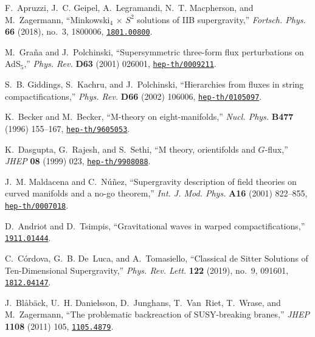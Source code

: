 \documentclass[12pt]{article}
\begin{document}
\begin{thebibliography}{10}
F.~Apruzzi, J.~C. Geipel, A.~Legramandi, N.~T. Macpherson, and M.~Zagermann,
  ``{Minkowski$_4$ $\times$ $S^2$ solutions of IIB supergravity},'' {\em
  Fortsch. Phys.} {\bf 66} (2018), no.~3, 1800006,
\href{http://arXiv.org/abs/1801.00800}{{\tt 1801.00800}}.


M.~Gra{\~n}a and J.~Polchinski, ``Supersymmetric {three-form} flux
  perturbations on {AdS$_5$},'' {\em Phys. Rev.} {\bf D63} (2001) 026001,
\href{http://arXiv.org/abs/hep-th/0009211}{{\tt hep-th/0009211}}.


S.~B. Giddings, S.~Kachru, and J.~Polchinski, ``Hierarchies from fluxes in
  string compactifications,'' {\em Phys. Rev.} {\bf D66} (2002) 106006,
\href{http://arXiv.org/abs/hep-th/0105097}{{\tt hep-th/0105097}}.


K.~Becker and M.~Becker, ``M-theory on eight-manifolds,'' {\em Nucl. Phys.}
  {\bf B477} (1996) 155--167,
\href{http://arXiv.org/abs/hep-th/9605053}{{\tt hep-th/9605053}}.


K.~Dasgupta, G.~Rajesh, and S.~Sethi, ``M theory, orientifolds and
  {$G$}-flux,'' {\em JHEP} {\bf 08} (1999) 023,
\href{http://arXiv.org/abs/hep-th/9908088}{{\tt hep-th/9908088}}.


J.~M. Maldacena and C.~N{\'u}{\~n}ez, ``Supergravity description of field
  theories on curved manifolds and a no-go theorem,'' {\em Int. J. Mod. Phys.}
  {\bf A16} (2001) 822--855,
\href{http://arXiv.org/abs/hep-th/0007018}{{\tt hep-th/0007018}}.


D.~Andriot and D.~Tsimpis, ``{Gravitational waves in warped
  compactifications},''
\href{http://arXiv.org/abs/1911.01444}{{\tt 1911.01444}}.


C.~C\'{o}rdova, G.~B. De~Luca, and A.~Tomasiello, ``{Classical de Sitter
  Solutions of Ten-Dimensional Supergravity},'' {\em Phys. Rev. Lett.} {\bf
  122} (2019), no.~9, 091601,
\href{http://arXiv.org/abs/1812.04147}{{\tt 1812.04147}}.


J.~{Bl\aa b\"ack}, U.~H. Danielsson, D.~Junghans, T.~Van~Riet, T.~Wrase, and
  M.~Zagermann, ``{The problematic backreaction of SUSY-breaking branes},''
  {\em JHEP} {\bf 1108} (2011) 105,
\href{http://arXiv.org/abs/1105.4879}{{\tt 1105.4879}}.



\end{thebibliography}
\end{document}
